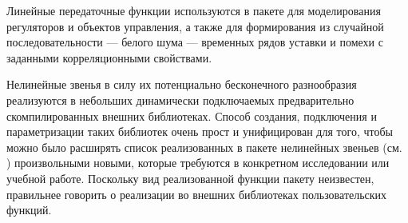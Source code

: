 Линейные передаточные функции используются в пакете для моделирования
регуляторов и объектов управления, а также для формирования из
случайной последовательности --- белого шума --- временных рядов
уставки и помехи с заданными корреляционными свойствами.


Нелинейные звенья в силу их потенциально бесконечного разнообразия
реализуются в небольших динамически подключаемых предварительно
скомпилированных внешних библиотеках.  Способ создания, подключения и
параметризации таких библиотек очень прост и унифицирован для того,
чтобы можно было расширять список реализованных в пакете нелинейных
звеньев (см. ) произвольными новыми,
которые требуются в конкретном исследовании или учебной работе.
Поскольку вид реализованной функции пакету неизвестен, правильнее
говорить о реализации во внешних библиотеках пользовательских функций.

